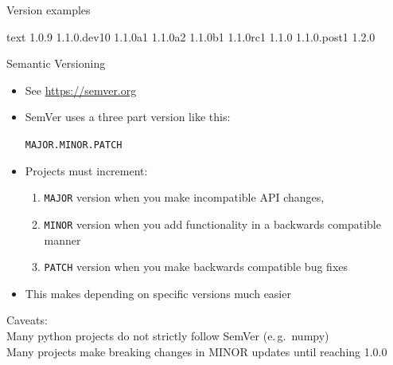 \begin{frame}[fragile, c]{Version examples}
  \begin{code}[title=Versions in sorted order]{text}
    1.0.9
    1.1.0.dev10
    1.1.0a1
    1.1.0a2
    1.1.0b1
    1.1.0rc1
    1.1.0
    1.1.0.post1
    1.2.0
  \end{code}
\end{frame}

\begin{frame}[c]{Semantic Versioning}
  \begin{itemize}
    \item See \url{https://semver.org}

    \item SemVer uses a three part version like this:
      \begin{center}
        \Large\texttt{MAJOR.MINOR.PATCH}
      \end{center}
    \item Projects must increment:
      \begin{enumerate}
        \item \texttt{MAJOR} version when you make incompatible API changes,
        \item \texttt{MINOR} version when you add functionality in a backwards compatible manner
        \item \texttt{PATCH} version when you make backwards compatible bug fixes
      \end{enumerate}
    \item This makes depending on specific versions much easier
  \end{itemize}

  \bigskip
  \begin{center}
    Caveats:\\
    Many python projects do not strictly follow SemVer (e.\,g.\ numpy) \\
    Many projects make breaking changes in MINOR updates until reaching 1.0.0
  \end{center}
\end{frame}

